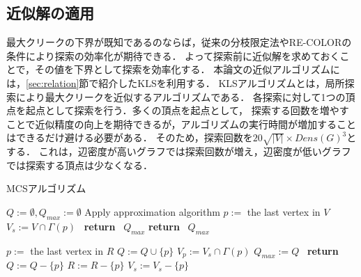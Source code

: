 \subsection{近似解の適用}
\label{sec:apply-approximate}
最大クリークの下界が既知であるのならば，従来の分枝限定法やRE-COLORの条件により探索の効率化が期待できる．
よって探索前に近似解を求めておくことで，その値を下界として探索を効率化する．
本論文の近似アルゴリズムには，\ref{sec:relation}節で紹介したKLSを利用する．
KLSアルゴリズムとは，局所探索により最大クリークを近似するアルゴリズムである．
各探索に対して1つの頂点を起点として探索を行う．多くの頂点を起点として，
探索する回数を増やすことで近似精度の向上を期待できるが，アルゴリズムの実行時間が増加することはできるだけ避ける必要がある．
そのため，探索回数を$20\sqrt{ |V|}\times Dens( G )^3$とする．
これは，辺密度が高いグラフでは探索回数が増え，辺密度が低いグラフでは探索する頂点は少なくなる．
\begin{algorithm}[htbp]
    \caption{MCSアルゴリズム}
    \small
    \label{alg:MCS_alg}
    \begin{algorithmic}[1]
		\State $Q:=\emptyset , Q_{max} := \emptyset$
		\State {}
		\State Apply approximation algorithm
			\State $p:=$ the last vertex in $V$
				\State $V_s:= V \cap \Gamma(p)$
				\State {}
			\Else \ \textbf{return} \ $Q_{max}$
			\EndIf
		\EndWhile
		\State \textbf{return} \ $Q_{max}$
	\EndProcedure
    \end{algorithmic}
    \begin{algorithmic}[1]
		\State {}
			\State $p:=$ the last vertex in $R$
				\State $ Q := Q \cup \{ p \}$
				\State $ V_p := V_s \cap \Gamma( p )$ 
					\State {}
					\State $Q_{max}:=Q$
				\EndIf
			\Else \  \textbf{return}
			\EndIf
			\State $Q := Q - \{ p \}$
			\State $R := R - \{ p \}$
			\State $V_s := V_s - \{ p \}$ 
		\EndWhile
	\EndProcedure
    \end{algorithmic}
\end{algorithm}


